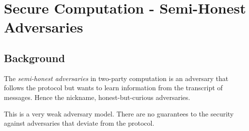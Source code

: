 \section{Secure Computation - Semi-Honest Adversaries}
\subsection{Background}
The {\it semi-honest adversaries} in two-party computation is an adversary that follows the protocol but wants to learn information from the transcript of messages. Hence the nickname, honest-but-curious adversaries. 
\begin{remark}
    This is a very weak adversary model. There are no guarantees to the security against adversaries that deviate from the protocol.
\end{remark}

